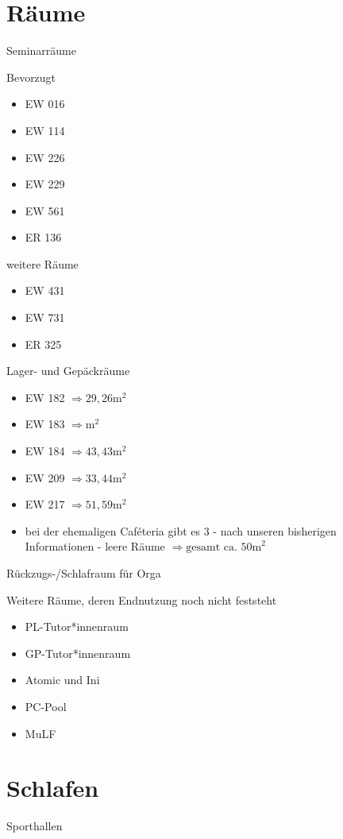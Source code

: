 \documentclass[compress,]{beamer}
\begin{document}
\section{Räume}
\begin{frame}{Seminarräume}
  \begin{block}{Bevorzugt}
    \begin{itemize}
      \item EW 016
      \item EW 114
      \item EW 226
      \item EW 229
      \item EW 561
      \item ER 136
    \end{itemize}
  \end{block}
\end{frame}

\begin{frame}
  \begin{block}{weitere Räume}
    \begin{itemize}
      \item EW 431
      \item EW 731
      \item ER 325
    \end{itemize}
  \end{block}
\end{frame}

\begin{frame}{Lager- und Gepäckräume}
  \begin{itemize}
    \item EW 182 $\Rightarrow 29,26 \mbox{m}^{2}$
    \item EW 183 $\Rightarrow  \mbox{m}^{2}$
    \item EW 184 $\Rightarrow 43,43 \mbox{m}^{2}$
    \item EW 209 $\Rightarrow 33,44 \mbox{m}^{2}$
    \item EW 217 $\Rightarrow 51,59 \mbox{m}^{2}$
    \item bei der ehemaligen Caféteria gibt es 3 - nach unseren bisherigen Informationen - leere Räume $\Rightarrow\mbox{gesamt ca. 50m}^{2}$
  \end{itemize}
\end{frame}

\begin{frame}{Rückzugs-/Schlafraum für Orga}
\end{frame}

\begin{frame}{Weitere Räume, deren Endnutzung noch nicht feststeht}
  \begin{itemize}
    \item PL-Tutor*innenraum
    \item GP-Tutor*innenraum
    \item Atomic und Ini
    \item PC-Pool
    \item MuLF
  \end{itemize}
\end{frame}

\section{Schlafen}
\begin{frame}{Sporthallen}
\end{frame}
\end{document}
